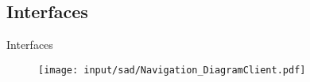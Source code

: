 \subsection{Interfaces}
\begin{frame}{Interfaces}

\begin{figure}[htbp]
	\begin{center}
	\texttt{[image: input/sad/Navigation\_DiagramClient.pdf]}
	\end{center}
\end{figure}

\end{frame}